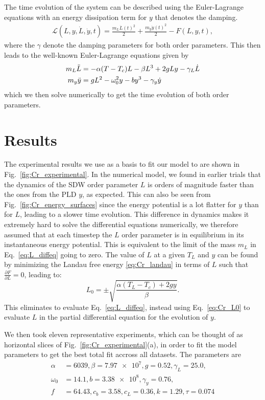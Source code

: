 The time evolution of the system can be described using the Euler-Lagrange equations with an energy dissipation term for $y$ that denotes the damping.
\begin{align}
    \mathcal{L}(L, y, \dot{L}, \dot{y}, t) = \frac{m_L \dot{L}(t)^2}{2} + \frac{m_y \dot{y}(t)^2}{2} - F(L, y, t),
\end{align}
where the $\gamma$ denote the damping parameters for both order parameters. This then leads to the well-known Euler-Lagrange equations given by
\begin{align}
    m_L \Ddot{L} &= -\alpha(T-T_c)L - \beta L^3 + 2g L y - \gamma_L \dot{L} \label{eq:L_diffeq}\\
    m_y \Ddot{y} &=gL^2 -\omega_0^2 y  - b y^3 - \gamma_y \dot{y} 
\end{align}
which we then solve numerically to get the time evolution of both order parameters.

\section{Results}
The experimental results we use as a basis to fit our model to are shown in Fig.~\ref{fig:Cr_experimental}. In the numerical model, we found in earlier trials that the dynamics of the SDW order parameter $L$ is orders of magnitude faster than the ones from the PLD $y$, as expected. This can also be seen from Fig.~\ref{fig:Cr_energy_surfaces} since the energy potential is a lot flatter for $y$ than for $L$, leading to a slower time evolution. This difference in dynamics makes it extremely hard to solve the differential equations numerically, we therefore assumed that at each timestep the $L$ order parameter is in equilibrium in its instantaneous energy potential. This is equivalent to the limit of the mass $m_L$ in Eq.~\ref{eq:L_diffeq} going to zero.
The value of $L$ at a given $T_L$ and $y$ can be found by minimizing the Landau free energy \ref{eq:Cr_landau} in terms of $L$ such that $\frac{\partial F}{\partial L} = 0$, leading to:
\begin{equation}
	\label{eq:Cr_L0}
	L_0 = \pm \sqrt{\frac{\alpha (T_L - T_c) + 2 g y}{\beta}}.
\end{equation}
This eliminates to evaluate Eq.~\ref{eq:L_diffeq}, instead using Eq.~\ref{eq:Cr_L0} to evaluate $L$ in the partial differential equation for the evolution of $y$.

We then took eleven representative experiments, which can be thought of as horizontal slices of Fig.~\ref{fig:Cr_experimental}(a), in order to fit the model parameters to get the best total fit accross all datasets. The parameters are
\begin{align}
	\alpha &= 6039, \beta = \SI{7.97e7}, g = 0.52, \gamma_L = 25.0, \\
	\omega_0 &= 14.1, b = \SI{3.38e8}, \gamma_y = 0.76,\\
	f &= 64.43, c_b = 3.58, c_L = 0.36, k = 1.29, \tau = 0.074
\end{align}

